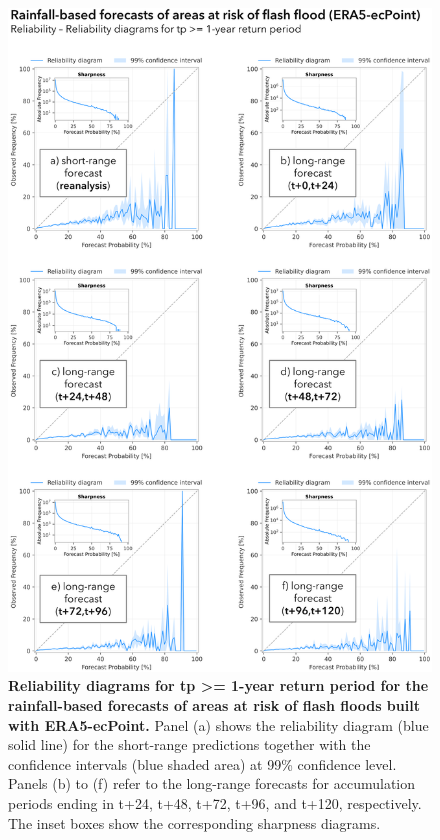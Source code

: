 \begin{figure}[htbp]
\centering
\includegraphics[width=\textwidth]{rainfall_based_ff_rel_diag_1rp.png}
\caption{\textbf{Reliability diagrams for tp >= 1-year return period for the rainfall-based forecasts of areas at risk of flash floods built with ERA5-ecPoint.} Panel (a) shows the reliability diagram (blue solid line) for the short-range predictions together with the confidence intervals (blue shaded area) at 99\% confidence level. Panels (b) to (f) refer to the long-range forecasts for accumulation periods ending in t+24, t+48, t+72, t+96, and t+120, respectively. The inset boxes show the corresponding sharpness diagrams.}
\label{fig:rainfall_based_ff_roc_1rp}
\end{figure}

